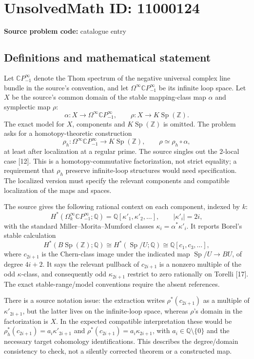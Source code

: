 \documentclass[11pt]{article}
\newcommand{\Z}{\mathbb{Z}}
\newcommand{\Q}{\mathbb{Q}}
\begin{document}
\section*{UnsolvedMath ID: 11000124}
\textbf{Source problem code:} catalogue entry
\subsection{Definitions and mathematical statement}
Let \(\mathbb CP^\infty_{-1}\) denote the Thom spectrum of the negative universal complex line bundle in the source's convention, and let \(\Omega^\infty\mathbb CP^\infty_{-1}\) be its infinite loop space. Let \(X\) be the source's common domain of the stable mapping-class map \(\alpha\) and symplectic map \(\rho\):
\[\alpha:X\to\Omega^\infty\mathbb CP^\infty_{-1},\qquad
\rho:X\to K\operatorname{Sp}(\Z).\]
The exact model for \(X\), components and \(K\operatorname{Sp}(\Z)\) is omitted. The problem asks for a homotopy-theoretic construction
\[\rho_h:\Omega^\infty\mathbb CP^\infty_{-1}\to K\operatorname{Sp}(\Z),\qquad
\rho\simeq\rho_h\circ\alpha,\]
at least after localization at a regular prime. The source singles out the \(2\)-local case [12]. This is a homotopy-commutative factorization, not strict equality; a requirement that \(\rho_h\) preserve infinite-loop structures would need specification. The localized version must specify the relevant components and compatible localization of the maps and spaces.

The source gives the following rational context on each component, indexed by \(k\):
\[H^*(\Omega_k^\infty\mathbb CP^\infty_{-1};\Q)=\Q[\kappa'_1,\kappa'_2,\ldots],\qquad |\kappa'_i|=2i,\]
with the standard Miller--Morita--Mumford classes \(\kappa_i=\alpha^*\kappa'_i\). It reports Borel's stable calculation
\[H^*(B\operatorname{Sp}(\Z);\Q)\cong H^*(\operatorname{Sp}/U;\Q)
\cong\Q[c_1,c_3,\ldots],\]
where \(c_{2i+1}\) is the Chern-class image under the indicated map \(\operatorname{Sp}/U\to BU\), of degree \(4i+2\). It says the relevant pullback of \(c_{2i+1}\) is a nonzero multiple of the odd \(\kappa\)-class, and consequently odd \(\kappa_{2i+1}\) restrict to zero rationally on Torelli [17]. The exact stable-range/model conventions require the absent references.

There is a source notation issue: the extraction writes \(\rho^*(c_{2i+1})\) as a multiple of \(\kappa'_{2i+1}\), but the latter lives on the infinite-loop space, whereas \(\rho\)'s domain in the factorization is \(X\). In the expected compatible interpretation these would be \(\rho_h^*(c_{2i+1})=a_i\kappa'_{2i+1}\) and \(\rho^*(c_{2i+1})=a_i\kappa_{2i+1}\), with \(a_i\in\Q\setminus\{0\}\) and the necessary target cohomology identifications. This describes the degree/domain consistency to check, not a silently corrected theorem or a constructed map.
\end{document}
